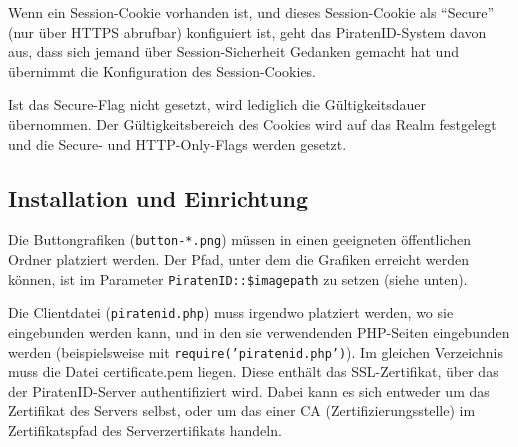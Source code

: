 Wenn ein Session-Cookie vorhanden ist, und dieses Session-Cookie als "`Secure"' (nur über HTTPS abrufbar) konfiguiert ist,
geht das PiratenID-System davon aus, dass sich jemand über Session-Sicherheit Gedanken gemacht hat und übernimmt
die Konfiguration des Session-Cookies.

Ist das Secure-Flag nicht gesetzt, wird lediglich die Gültigkeitsdauer übernommen.
Der Gültigkeitsbereich des Cookies wird auf das Realm festgelegt und die Secure- und HTTP-Only-Flags werden gesetzt.

\subsection{Installation und Einrichtung}
Die Buttongrafiken (\texttt{button-*.png}) müssen in einen geeigneten öffentlichen Ordner platziert werden.
Der Pfad, unter dem die Grafiken erreicht werden können, ist im Parameter \texttt{PiratenID::\$imagepath} zu setzen (siehe unten).

Die Clientdatei (\texttt{piratenid.php}) muss irgendwo platziert werden, wo sie eingebunden werden kann,
und in den sie verwendenden PHP-Seiten eingebunden werden (beispielsweise mit \texttt{require('piratenid.php')}).
Im gleichen Verzeichnis muss die Datei certificate.pem liegen.
Diese enthält das SSL-Zertifikat, über das der PiratenID-Server authentifiziert wird.
Dabei kann es sich entweder um das Zertifikat des Servers selbst, oder um das einer CA (Zertifizierungsstelle) im Zertifikatspfad des Serverzertifikats handeln.

